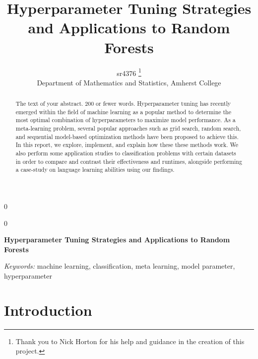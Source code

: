 \documentclass[12pt]{article}
\newcommand{\blind}{0}
\begin{document}
\def\spacingset#1{\renewcommand{\baselinestretch}%
{#1}\small\normalsize} \spacingset{1}



\blind
{
  \title{\bf Hyperparameter Tuning Strategies and Applications to Random
Forests}

  \author{
        sr4376 \thanks{Thank you to Nick Horton for his help and
guidance in the creation of this project.} \\
    Department of Mathematics and Statistics, Amherst College\\
      }
  \maketitle
} \fi

\blind
{
  \bigskip
  \bigskip
  \bigskip
  \begin{center}
    {\LARGE\bf Hyperparameter Tuning Strategies and Applications to
Random Forests}
  \end{center}
  \medskip
} \fi

\bigskip
\begin{abstract}
The text of your abstract. 200 or fewer words. Hyperparameter tuning has
recently emerged within the field of machine learning as a popular
method to determine the most optimal combination of hyperparameters to
maximize model performance. As a meta-learning problem, several popular
approaches such as grid search, random search, and sequential
model-based optimization methods have been proposed to achieve this. In
this report, we explore, implement, and explain how these these methods
work. We also perform some application studies to classification
problems with certain datasets in order to compare and contrast their
effectiveness and runtimes, alongside performing a case-study on
language learning abilities using our findings.
\end{abstract}

\noindent%
{\it Keywords:} machine learning, classification, meta learning, model
parameter, hyperparameter
\vfill

\newpage
\spacingset{1.45} %

\hypertarget{introduction}{%
\section{Introduction}\label{introduction}}
\end{document}
